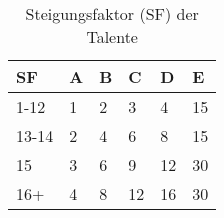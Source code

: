 \begin{table}[h]
\begin{center}
\begin{tabular}{|l|l|l|l|l|l|}
\hline
\textbf{SF} & \textbf{A} & \textbf{B} & \textbf{C} & \textbf{D} & \textbf{E} \\

\hline
1-12 & 1 & 2 & 3 & 4 & 15 \\

\hline
13-14 & 2 & 4 & 6 & 8 & 15 \\

\hline
15 & 3 & 6 & 9 & 12 & 30 \\

\hline
16+ & 4 & 8 & 12 & 16 & 30 \\

\hline
\end{tabular}
\end{center}
\caption{Steigungsfaktor (SF) der Talente}
\label{tab:Steigungsfaktor}
\end{table}

